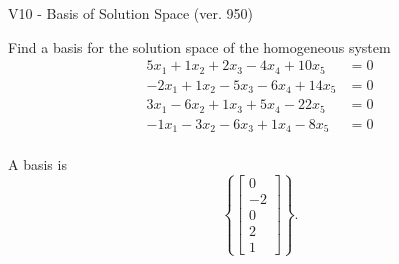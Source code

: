 \begin{exercise}
  \begin{exerciseTitle}V10 - Basis of Solution Space (ver. 950)\end{exerciseTitle}
  \begin{exerciseStatement}
    Find a basis for the solution space of the homogeneous system 
\begin{align*}
 5 x_ 1 + 1 x_ 2 + 2 x_ 3 -4 x_ 4 + 10 x_ 5 &= 0  \\ 
  -2 x_ 1 + 1 x_ 2 -5 x_ 3 -6 x_ 4 + 14 x_ 5 &= 0  \\ 
  3 x_ 1 -6 x_ 2 + 1 x_ 3 + 5 x_ 4 -22 x_ 5 &= 0  \\ 
  -1 x_ 1 -3 x_ 2 -6 x_ 3 + 1 x_ 4 -8 x_ 5 &= 0  \\ 
 \end{align*}


 
  \end{exerciseStatement}

  \begin{exerciseAnswer}
   A basis is   
\[\left\{\left[\begin{array}{c}
0 \\
-2 \\
0 \\
2 \\
1
\end{array}\right]\right\}.\]

  


  \end{exerciseAnswer}
\end{exercise}